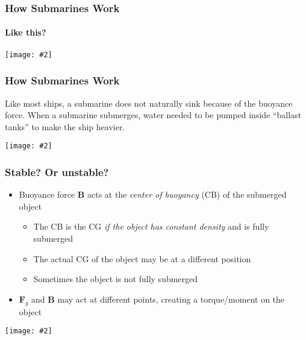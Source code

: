 \documentclass[12pt,aspectratio=169]{beamer}
\newcommand{\pic}[2]{\texttt{[image: \#2]}}
\newcommand{\mb}[1]{\mathbf{#1}}
\begin{document}


\begin{frame}
  \frametitle{How Submarines Work}
  \framesubtitle{Like this?}
  \begin{center}
    \pic{.7}{EbHMOXk.jpg}
  \end{center}
\end{frame}


\begin{frame}
  \frametitle{How Submarines Work}
  Like most ships, a submarine does not naturally sink because of the buoyance
  force. When a submarine submerges, water needed to be pumped inside
  ``ballast tanks'' to make the ship heavier.
  \begin{center}
    \pic{1}{risinglemur.jpg}
  \end{center}
\end{frame}


\begin{frame}
  \frametitle{Stable? Or unstable?}
  \begin{itemize}
  \item Buoyance force $\mb{B}$ acts at the \emph{center of buoyancy} (CB) of
    the submerged object
    \begin{itemize}
    \item The CB is the CG \emph{if the object has constant density} and is
      fully submerged
    \item The actual CG of the object may be at a different position
    \item Sometimes the object is not fully submerged
    \end{itemize}
  \item $\mb{F}_g$ and $\mb{B}$ may act at different points, creating
    a torque/moment on the object
  \end{itemize}
  \begin{center}
    \vspace{-.15in}
    \pic{.6}{stable-unstable.jpg}
  \end{center}
\end{frame}
\end{document}
